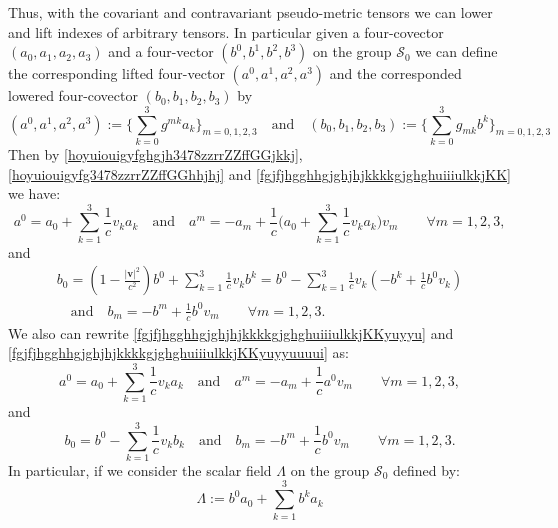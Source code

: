 \documentclass{article}
\theoremstyle{definition}
\theoremstyle{remark}
\renewcommand{\vec}[1]{\mathbf{#1}}
\newcommand{\er}{\eqref}
\newcommand{\er}{\eqref}
\begin{document}
Thus, with the covariant and contravariant pseudo-metric tensors we
can lower and lift indexes of arbitrary tensors. In particular given
a four-covector $(a_0,a_1,a_2,a_3)$ and a four-vector
$(b^0,b^1,b^2,b^3)$ on the group $\mathcal{S}_0$ we can define the
corresponding lifted four-vector $(a^0,a^1,a^2,a^3)$ and the
corresponded lowered four-covector $(b_0,b_1,b_2,b_3)$ by
\begin{equation}\label{fgjfjhgghhgjghjhjkkkkgjghghuiiiulkkjKK}
(a^0,a^1,a^2,a^3):=\Big\{\sum_{k=0}^{3}g^{mk}a_{k}\Big\}_{m=0,1,2,3}\quad\text{and}\quad
(b_0,b_1,b_2,b_3):=\Big\{\sum_{k=0}^{3}g_{mk}b^{k}\Big\}_{m=0,1,2,3}
\end{equation}
Then by \er{hoyuiouigyfghgjh3478zzrrZZffGGjkkj},
\er{hoyuiouigyfg3478zzrrZZffGGhhjhj} and
\er{fgjfjhgghhgjghjhjkkkkgjghghuiiiulkkjKK} we have:
\begin{equation}\label{fgjfjhgghhgjghjhjkkkkgjghghuiiiulkkjKKyuyyu}
a^0=a_{0}+\sum_{k=1}^{3}\frac{1}{c}v_k a_{k}\quad\text{and}\quad
a^m=-a_{m}+\frac{1}{c}\bigg(a_{0}+\sum_{k=1}^{3}\frac{1}{c}v_k
a_{k}\bigg)v_m\quad\quad\forall m=1,2,3,
\end{equation}
and
\begin{multline}\label{fgjfjhgghhgjghjhjkkkkgjghghuiiiulkkjKKyuyyuuuui}
b_0=\left(1-\frac{|\vec
v|^2}{c^2}\right)b^{0}+\sum_{k=1}^{3}\frac{1}{c}v_k
b^{k}=b^0-\sum_{k=1}^{3}\frac{1}{c}v_k\left(-
b^{k}+\frac{1}{c}b^0v_k\right)\\ \quad\text{and}\quad
b_m=-b^{m}+\frac{1}{c} b^{0}v_m\quad\quad\forall m=1,2,3.
\end{multline}
We also can rewrite \er{fgjfjhgghhgjghjhjkkkkgjghghuiiiulkkjKKyuyyu}
and \er{fgjfjhgghhgjghjhjkkkkgjghghuiiiulkkjKKyuyyuuuui} as:
\begin{equation}\label{fgjfjhgghhgjghjhjkkkkgjghghuiiiulkkjKKyuyyuioui}
a^0=a_{0}+\sum_{k=1}^{3}\frac{1}{c}v_k a_{k}\quad\text{and}\quad
a^m=-a_{m}+\frac{1}{c}a^0v_m\quad\quad\forall m=1,2,3,
\end{equation}
and
\begin{equation}\label{fgjfjhgghhgjghjhjkkkkgjghghuiiiulkkjKKyuyyuuuuiiuii}
b_0=b^0-\sum_{k=1}^{3}\frac{1}{c}v_kb_k \quad\text{and}\quad
b_m=-b^{m}+\frac{1}{c} b^{0}v_m\quad\quad\forall m=1,2,3.
\end{equation}
In particular, if we consider the scalar field $\Lambda$ on the
group $\mathcal{S}_0$ defined by:
\begin{equation}\label{fgjfjhgghhgjghjhjkkkkgjghghuiiiulkkjKKyuyyu0io}
\Lambda:=b^0a_0+\sum_{k=1}^{3}b^ka_k
\end{equation}
\end{document}
